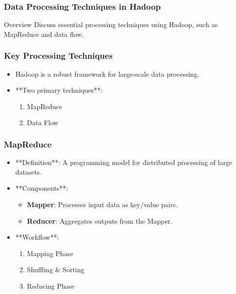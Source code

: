 \documentclass[aspectratio=169]{beamer}
\begin{document}
\begin{frame}
    \frametitle{Data Processing Techniques in Hadoop}
    \begin{block}{Overview}
        Discuss essential processing techniques using Hadoop, such as MapReduce and data flow.
    \end{block}
\end{frame}

\begin{frame}
    \frametitle{Key Processing Techniques}
    \begin{itemize}
        \item Hadoop is a robust framework for large-scale data processing.
        \item **Two primary techniques**:
        \begin{enumerate}
            \item MapReduce
            \item Data Flow
        \end{enumerate}
    \end{itemize}
\end{frame}

\begin{frame}[fragile]
    \frametitle{MapReduce}
    \begin{itemize}
        \item **Definition**: A programming model for distributed processing of large datasets.
        \item **Components**:
        \begin{itemize}
            \item \textbf{Mapper}: Processes input data as key/value pairs.
            \item \textbf{Reducer}: Aggregates outputs from the Mapper.
        \end{itemize}
        \item **Workflow**:
        \begin{enumerate}
            \item Mapping Phase
            \item Shuffling \& Sorting
            \item Reducing Phase
        \end{enumerate}
    \end{itemize}
\end{frame}
\end{document}
